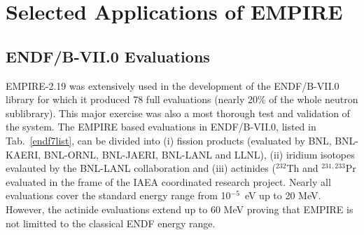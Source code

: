 \section{Selected Applications of EMPIRE}

\subsection{ENDF/B-VII.0 Evaluations}

EMPIRE-2.19 was extensively used in the development of the ENDF/B-VII.0
library for which it produced 78 full evaluations (nearly 20\% of the whole
neutron sublibrary). This major exercise was also a most thorough test and
validation of the system. The EMPIRE based evaluations in ENDF/B-VII.0,
listed in Tab.~\ref{endf7list}, can be divided into (i) fission products
(evaluated by BNL, BNL-KAERI, BNL-ORNL, BNL-JAERI, BNL-LANL and LLNL), (ii)
iridium isotopes evalauted by the BNL-LANL collaboration and (iii) actinides
($^{232}$Th and $^{231,233}$Pr evaluated in the frame of the IAEA
coordinated research project. Nearly all evaluations cover the standard
energy range from 10$^{-5}$~eV up to 20 MeV. However, the actinide
evaluations extend up to 60 MeV proving that EMPIRE is not limitted to the
classical ENDF energy range.


